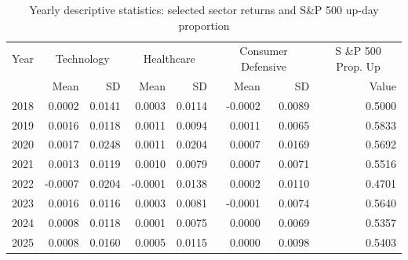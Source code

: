 \begin{table}[htbp]
\centering
\begin{tabular}{lrr|rr|rr|r}
\hline
Year & \multicolumn{2}{c|}{Technology} & \multicolumn{2}{c|}{Healthcare} & \multicolumn{2}{c|}{Consumer Defensive} & \multicolumn{1}{c}{S \&P 500 Prop. Up} \\
 & Mean & SD & Mean & SD & Mean & SD & Value \\
\hline
2018 & 0.0002 & 0.0141 & 0.0003 & 0.0114 & -0.0002 & 0.0089 & 0.5000 \\
2019 & 0.0016 & 0.0118 & 0.0011 & 0.0094 & 0.0011 & 0.0065 & 0.5833 \\
2020 & 0.0017 & 0.0248 & 0.0011 & 0.0204 & 0.0007 & 0.0169 & 0.5692 \\
2021 & 0.0013 & 0.0119 & 0.0010 & 0.0079 & 0.0007 & 0.0071 & 0.5516 \\
2022 & -0.0007 & 0.0204 & -0.0001 & 0.0138 & 0.0002 & 0.0110 & 0.4701 \\
2023 & 0.0016 & 0.0116 & 0.0003 & 0.0081 & -0.0001 & 0.0074 & 0.5640 \\
2024 & 0.0008 & 0.0118 & 0.0001 & 0.0075 & 0.0000 & 0.0069 & 0.5357 \\
2025 & 0.0008 & 0.0160 & 0.0005 & 0.0115 & 0.0000 & 0.0098 & 0.5403 \\
\hline
\end{tabular}
\caption{Yearly descriptive statistics: selected sector returns and S\&P 500 up-day proportion}
\label{tab:descriptive_stats}
\end{table}
